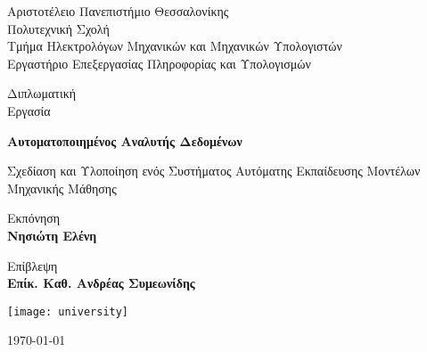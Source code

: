 \begin{titlepage}
	\begin{center}
	\small
	Αριστοτέλειο Πανεπιστήμιο Θεσσαλονίκης\\
	Πολυτεχνική Σχολή\\
	Τμήμα Ηλεκτρολόγων Μηχανικών και Μηχανικών Υπολογιστών\\
	Εργαστήριο Επεξεργασίας Πληροφορίας και Υπολογισμών\\
			
		\vspace{1.5cm}
		
		\LARGE
		Διπλωματική\\
		Εργασία		
		\vspace{0.3cm}
		
		\Huge
		\textbf{Αυτοματοποιημένος Αναλυτής Δεδομένων}
		
		\vspace{0.3cm}
		\LARGE
		Σχεδίαση και Υλοποίηση ενός Συστήματος Αυτόματης Εκπαίδευσης Μοντέλων Μηχανικής Μάθησης
		
		\vspace{1.5cm}
		
		Εκπόνηση \\
		\textbf{Νησιώτη Ελένη}
		
		\vspace{1.5cm}
		
		Επίβλεψη \\
		\textbf{Επίκ. Καθ. Ανδρέας Συμεωνίδης}
		
		
		
		\texttt{[image: university]}
		
			
		\today

		
	\end{center}
\end{titlepage}

